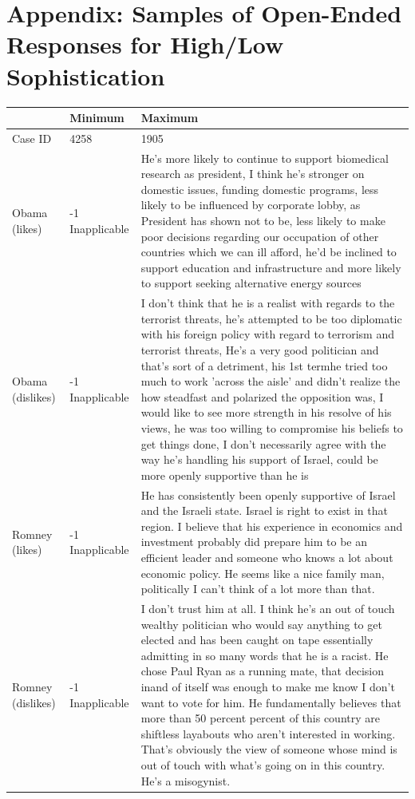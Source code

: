 \documentclass[12pt]{article}
\begin{document}
\clearpage\singlespacing\footnotesize



\clearpage
\section*{Appendix: Samples of Open-Ended Responses for High/Low Sophistication}

\begin{longtable}[ht]{p{1.4cm}lp{12cm}}
  \hline
 & Minimum & Maximum \\ 
  \hline
Case ID & 4258 & 1905 \\ 
  Obama (likes) & -1 Inapplicable & He's more likely to continue to support biomedical research as president, I think he's stronger on domestic issues, funding domestic programs, less likely to be influenced by corporate lobby, as President has shown not to be, less likely to make poor decisions regarding our occupation of other countries which we can ill afford, he'd be inclined to support education and infrastructure and more likely to support seeking alternative energy sources \\ 
  Obama (dislikes) & -1 Inapplicable & I don't think that he is a realist with regards to the terrorist threats, he's attempted to be too diplomatic with his foreign policy with regard to terrorism and terrorist threats, He's a very good politician and that's sort of a detriment, his 1st termhe tried too much to work 'across the aisle' and didn't realize the how steadfast and polarized the opposition was, I would like to see more strength in his resolve of his views, he was too willing to compromise his beliefs to get things done, I don't necessarily agree with the way he's handling his support of Israel, could be more openly supportive than he is \\ 
  Romney (likes) & -1 Inapplicable & He has consistently been openly supportive of Israel and the Israeli state.  Israel is right to exist in that region.  I believe that his experience in economics and investment probably did prepare him to be an efficient leader and someone who knows a lot about economic policy. He seems like a nice family man, politically I can't think of a lot more than that. \\ 
  Romney (dislikes) & -1 Inapplicable & I don't trust him at all. I think he's an out of touch wealthy politician who would say anything to get elected and has been caught on tape essentially admitting in so many words that he is a racist. He chose Paul Ryan as a running mate, that decision inand of itself was enough to make me know I don't want to vote for him. He fundamentally believes that more than 50 percent  percent of this country are shiftless layabouts who aren't interested in working.  That's obviously the view of someone whose mind is out of touch with what's going on in this country. He's a misogynist. \\ 

\end{longtable}
\end{document}
